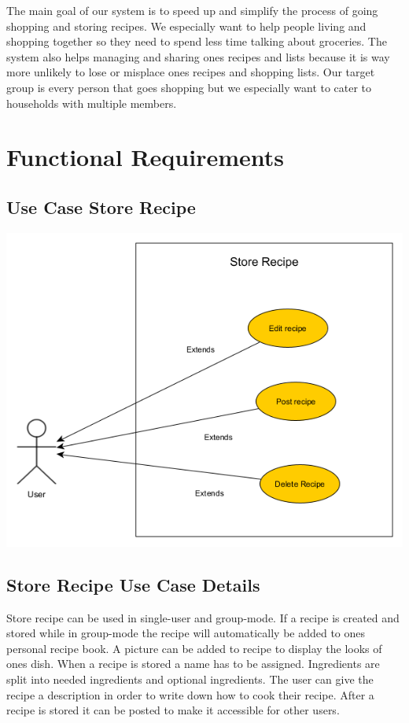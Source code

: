 \documentclass[12pt]{article}
\theoremstyle{definition}
\begin{document}
The main goal of our system is to speed up and simplify the process of going shopping and storing recipes. We especially want to help people living and shopping together so they need to spend less time talking about groceries. The system also helps managing and sharing ones recipes and lists because it is way more unlikely to lose or misplace ones recipes and shopping lists.
Our target group is every person that goes shopping but we especially want to cater to households with multiple members.

\pagebreak

\section{Functional Requirements}

\subsection{Use Case Store Recipe}

\includegraphics[scale=.5]{Images/UseCaseStoreRecipe.png}\\

\subsection{Store Recipe Use Case Details}

Store recipe can be used in single-user and group-mode. If a recipe is created and stored while in group-mode the recipe will automatically be added to ones personal recipe book. A picture can be added to recipe to display the looks of ones dish. When a recipe is stored a name has to be assigned. Ingredients are split into needed ingredients and optional ingredients. The user can give the recipe a description in order to write down how to cook their recipe. After a recipe is stored it can be posted to make it accessible for other users.
\end{document}
